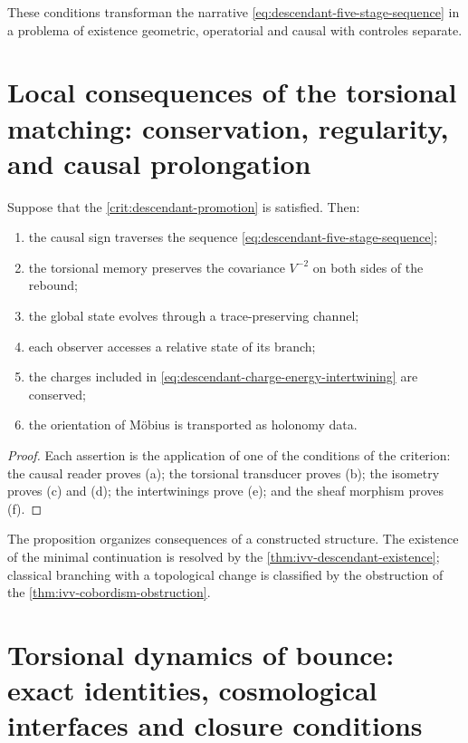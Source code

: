 These conditions transforman the narrative
\cref{eq:descendant-five-stage-sequence} in a problema of existence
geometric, operatorial and causal with controles separate.

\section{Local consequences of the torsional matching: conservation, regularity, and causal prolongation}

\begin{proposition}
\label{prop:descendant-conditioned-consequences}
Suppose that the
\cref{crit:descendant-promotion} is satisfied. Then:
\begin{enumerate}[label=\alph*)]
 \item the causal sign traverses the sequence
       \cref{eq:descendant-five-stage-sequence};
 \item the torsional memory preserves the covariance \(V^{-2}\) on both
       sides of the rebound;
 \item the global state evolves through a trace-preserving channel;
 \item each observer accesses a relative state of its branch;
 \item the charges included in
       \cref{eq:descendant-charge-energy-intertwining} are conserved;
 \item the orientation of Möbius is transported as holonomy data.
\end{enumerate}
\end{proposition}

\begin{proof}
Each assertion is the application of one of the conditions of the criterion:
the causal reader proves (a); the torsional transducer proves (b); the isometry
proves (c) and (d); the intertwinings prove (e); and the sheaf morphism proves
(f).
\end{proof}

The proposition organizes consequences of a constructed structure. The
existence of the minimal continuation is resolved by the
\cref{thm:ivv-descendant-existence}; classical branching with a
topological change is classified by the obstruction of the
\cref{thm:ivv-cobordism-obstruction}.

\section{Torsional dynamics of bounce: exact identities, cosmological interfaces and closure conditions}


